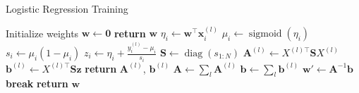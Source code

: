 \documentclass[12pt]{article}
\DeclareMathOperator*{\sigmoid}{sigmoid}
\DeclareMathOperator*{\diag}{diag}
\begin{document}

\begin{algorithm}

  \caption{Logistic Regression Training}

  \begin{algorithmic}[1] %
                  \State Initialize weights $\mathbf{w} \gets \mathbf{0}$
                  \State \textbf{return} $\mathbf{w}$
          \EndProcedure
          \Loop
                   
                          \State $\eta_i \gets \mathbf{w}^{\top} \mathbf{x}_i^{(l)}$ 
                          \State $\mu_i \gets \sigmoid(\eta_i)$
                          \State $s_i \gets \mu_i (1 - \mu_i)$
                          \State $z_i \gets \eta_i + \frac{y_i^{(l)} - \mu_i}{s_i}$
                          \State $\mathbf{S} \gets \diag(s_{1:N})$
                          \State $\mathbf{A}^{(l)} \gets X^{(l)\top} \mathbf{S} X^{(l)}$
                          \State $\mathbf{b}^{(l)} \gets X^{(l)\top} \mathbf{S} \mathbf{z}$
                          \State \textbf{return} $\mathbf{A}^{(l)}$, $\mathbf{b}^{(l)}$
                  \EndProcedure
                          \State $\mathbf{A} \gets \sum_l \mathbf{A}^{(l)}$
                          \State $\mathbf{b} \gets \sum_l \mathbf{b}^{(l)}$
                          \State $\mathbf{w'} \gets \mathbf{A}^{-1} \mathbf{b}$
                                  \State \textbf{break}
                          \EndIf
                          \State \textbf{return} $\mathbf{w}$
                  \EndProcedure
          \EndLoop
  \end{algorithmic}

\end{algorithm}
\end{document}
